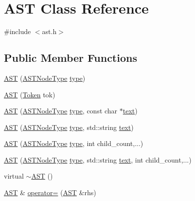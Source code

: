 \hypertarget{class_a_s_t}{\section{A\-S\-T Class Reference}
\label{class_a_s_t}
}


{\ttfamily \#include $<$ast.\-h$>$}

\subsection*{Public Member Functions}
\begin{DoxyCompactItemize}
\item 
\hyperlink{class_a_s_t_a6ac7ddb23729a313ba6b66ad09ab79bd}{A\-S\-T} (\hyperlink{ast_8h_a0a931957f12a2075e6e11ee596651dff}{A\-S\-T\-Node\-Type} \hyperlink{class_a_s_t_ad947af30e5dbb743c41769296dc03c9d}{type})
\item 
\hyperlink{class_a_s_t_a039b00473e1617d1c3003b0a22d5f2d9}{A\-S\-T} (\hyperlink{class_token}{Token} tok)
\item 
\hyperlink{class_a_s_t_a56011c7a97fd6277c72e88c2acd6a96e}{A\-S\-T} (\hyperlink{ast_8h_a0a931957f12a2075e6e11ee596651dff}{A\-S\-T\-Node\-Type} \hyperlink{class_a_s_t_ad947af30e5dbb743c41769296dc03c9d}{type}, const char $\ast$\hyperlink{class_a_s_t_ad975048d27d24ffe87e95b1eed995d5e}{text})
\item 
\hyperlink{class_a_s_t_a341ac3dbf80dad18be249944c0b5f222}{A\-S\-T} (\hyperlink{ast_8h_a0a931957f12a2075e6e11ee596651dff}{A\-S\-T\-Node\-Type} \hyperlink{class_a_s_t_ad947af30e5dbb743c41769296dc03c9d}{type}, std\-::string \hyperlink{class_a_s_t_ad975048d27d24ffe87e95b1eed995d5e}{text})
\item 
\hyperlink{class_a_s_t_a5f463c2fad1523f2dfea906e25e60d91}{A\-S\-T} (\hyperlink{ast_8h_a0a931957f12a2075e6e11ee596651dff}{A\-S\-T\-Node\-Type} \hyperlink{class_a_s_t_ad947af30e5dbb743c41769296dc03c9d}{type}, int child\-\_\-count,...)
\item 
\hyperlink{class_a_s_t_aab868b0cf41c496ee5654fb17e61e63c}{A\-S\-T} (\hyperlink{ast_8h_a0a931957f12a2075e6e11ee596651dff}{A\-S\-T\-Node\-Type} \hyperlink{class_a_s_t_ad947af30e5dbb743c41769296dc03c9d}{type}, std\-::string \hyperlink{class_a_s_t_ad975048d27d24ffe87e95b1eed995d5e}{text}, int child\-\_\-count,...)
\item 
virtual \hyperlink{class_a_s_t_ad332977af5d4ea0ec793c4843544b6e2}{$\sim$\-A\-S\-T} ()
\item 
\hyperlink{class_a_s_t}{A\-S\-T} \& \hyperlink{class_a_s_t_aa28dd92452d4f89c16a4de0058905e16}{operator=} (\hyperlink{class_a_s_t}{A\-S\-T} \&rhs)

\end{DoxyCompactItemize}
